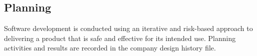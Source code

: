\subsection{Planning}
Software development is conducted using an iterative and risk-based approach to
delivering a product that is safe and effective for its intended use. Planning
activities and results are recorded in the \gls{company} design history file.
